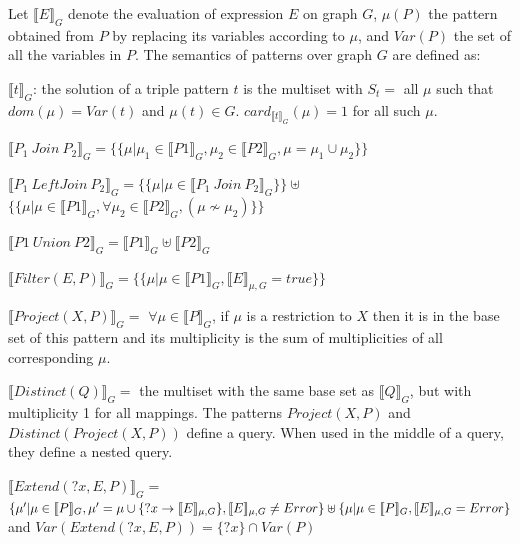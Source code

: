 Let $\llbracket E \rrbracket_G$ denote the evaluation of expression $E$ on graph $G$, $\mu(P)$ the pattern obtained from $P$ by replacing its variables according to $\mu$,
and $Var(P)$ the set of all the variables
in $P$.
The semantics of patterns over graph $G$ are defined as:
\squishlist
    \item  $\llbracket t \rrbracket_G$: the solution of a triple pattern $t$ is the multiset with $S_t = $ all $\mu$ such that $dom(\mu) = Var(t)$ and $\mu(t) \in G$. $card_{\llbracket t \rrbracket_G}(\mu) = 1$ for all such $\mu$.
    \item $\llbracket P_1\ Join\ P_2 \rrbracket_G = \{\{
    \mu | \mu_1 \in \llbracket P1 \rrbracket_G, \mu_2 \in \llbracket P2 \rrbracket_G, \mu = \mu_1 \cup \mu_2
    \}\}$
    \item $\llbracket P_1\ LeftJoin\ P_2 \rrbracket_G = 
    \{\{
    \mu | \mu \in \llbracket P_1\ Join\ P_2 \rrbracket_G
    \}\} \uplus $\\
    $\{\{\mu | \mu \in \llbracket P1 \rrbracket_G, \forall \mu_2 \in \llbracket P2 \rrbracket_G, (\mu \nsim \mu_2)
    \}\}$
    \item $\llbracket P1\ Union\ P2 \rrbracket_G =  \llbracket P1 \rrbracket_G \uplus	 \llbracket P2 \rrbracket_G$
    \item $\llbracket Filter(E, P)\rrbracket_G = \{\{    \mu | \mu \in \llbracket P1 \rrbracket_G, \llbracket E \rrbracket_{\mu,G} =true \}\}$
    \item $\llbracket Project(X, P)\rrbracket_G = $   $\forall \mu \in \llbracket P\rrbracket_G$, if $\mu$ is a restriction to $X$ then it is in the base set of this pattern and its multiplicity is
    the
    sum of multiplicities of all corresponding $\mu$.
    \begin{sloppypar}
    \item $\llbracket Distinct(Q) \rrbracket_G = $  the multiset with the same base set as $\llbracket Q \rrbracket_G$, but with multiplicity 1 for all mappings.
The \sparql patterns $Project (X, P)$ and $Distinct(Project(X, P))$ define a \sparql query.
When used in the middle of a query, they define a nested query.
    \end{sloppypar}
    \begin{sloppypar}
    \item $\llbracket Extend(?x, E, P)\rrbracket_G =$\\ $\{\mu'| \mu \in \llbracket P\rrbracket_G, \mu'=\mu\cup\{?x\rightarrow \llbracket E\rrbracket_{\mu,G}\}, \llbracket E\rrbracket_{\mu,G} \neq Error \} \uplus \\ \{\mu| \mu \in \llbracket P\rrbracket_G, \llbracket E \rrbracket_{\mu,G} =  Error \} $ and $Var(Extend(?x, E, P)) = \{?x\} \cap Var(P)$
    \end{sloppypar}
